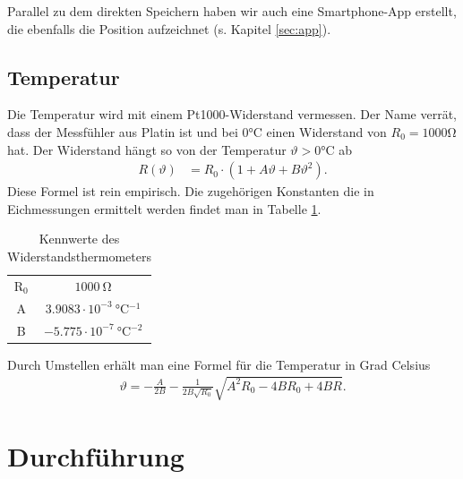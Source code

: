 \documentclass[12pt,a4paper,titlepage,headinclude,bibtotoc]{scrartcl}
\numberwithin{equation}{subsection}
\begin{document}
Parallel zu dem direkten Speichern haben wir auch eine Smartphone-App erstellt, die ebenfalls die Position aufzeichnet (s. Kapitel \ref{sec:app}).


\subsection{Temperatur}
Die Temperatur wird mit einem Pt1000-Widerstand vermessen.
Der Name verrät, dass der Messfühler aus Platin ist und bei $0\si{\celsius}$ einen Widerstand von $R_0=1000\si{\ohm}$ hat.
Der Widerstand hängt so von der Temperatur $\vartheta>0\si{\celsius}$ ab
\begin{align}
	R(\vartheta)&=R_0\cdot\left(1 + A\vartheta + B\vartheta^2\right). \label{eq:Pt1000}
\end{align}
Diese Formel ist rein empirisch. 
Die zugehörigen Konstanten die in Eichmessungen ermittelt werden findet man in Tabelle \ref{tab:Pt1000}.

\begin{table}[!htb]
	\centering
	\begin{tabular}{|c|c|}
		\hline
		R$_0$ & $1000 ~ \si{\ohm}$\\
		A   & $3.9083 \cdot 10^{-3} ~ \si{\celsius^{-1}}$\\
		B   & $-5.775 \cdot 10^{-7} ~ \si{\celsius^{-2}}$\\
		\hline
	\end{tabular}
	\caption{Kennwerte des Widerstandsthermometers}
	\label{tab:Pt1000}
\end{table}

Durch Umstellen erhält man eine Formel für die Temperatur in Grad Celsius
\begin{align}
 \vartheta = -\frac{A}{2 B} - \frac{1}{2 B \sqrt{R_0}} \sqrt{A^2 R_0  - 4 B R_0 + 4 B R    }\label{eq:temperapt1000} .
\end{align}



\section{Durchführung}
\label{sec:durchfuehrung}
\end{document}
